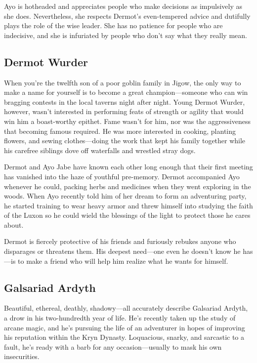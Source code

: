 \documentclass[letterpaper, 11pt, bg=full, twocolumn]{dndbook}
\begin{document}
Ayo is hotheaded and appreciates people who make decisions as impulsively as she does. Nevertheless, she respects Dermot's even-tempered advice and dutifully plays the role of the wise leader. She has no patience for people who are indecisive, and she is infuriated by people who don't say what they really mean.

\subsection{Dermot Wurder}


When you're the twelfth son of a poor goblin family in Jigow, the only way to make a name for yourself is to become a great champion---someone who can win bragging contests in the local taverns night after night. Young Dermot Wurder, however, wasn't interested in performing feats of strength or agility that would win him a boast-worthy epithet. Fame wasn't for him, nor was the aggressiveness that becoming famous required. He was more interested in cooking, planting flowers, and sewing clothes---doing the work that kept his family together while his carefree siblings dove off waterfalls and wrestled stray dogs.

Dermot and Ayo Jabe have known each other long enough that their first meeting has vanished into the haze of youthful pre-memory. Dermot accompanied Ayo whenever he could, packing herbs and medicines when they went exploring in the woods. When Ayo recently told him of her dream to form an adventuring party, he started training to wear heavy armor and threw himself into studying the faith of the Luxon so he could wield the blessings of the light to protect those he cares about.

Dermot is fiercely protective of his friends and furiously rebukes anyone who disparages or threatens them. His deepest need---one even he doesn't know he has---is to make a friend who will help him realize what he wants for himself.

\subsection{Galsariad Ardyth}


Beautiful, ethereal, deathly, shadowy---all accurately describe Galsariad Ardyth, a drow in his two-hundredth year of life. He's recently taken up the study of arcane magic, and he's pursuing the life of an adventurer in hopes of improving his reputation within the Kryn Dynasty. Loquacious, snarky, and sarcastic to a fault, he's ready with a barb for any occasion---usually to mask his own insecurities.
\end{document}
